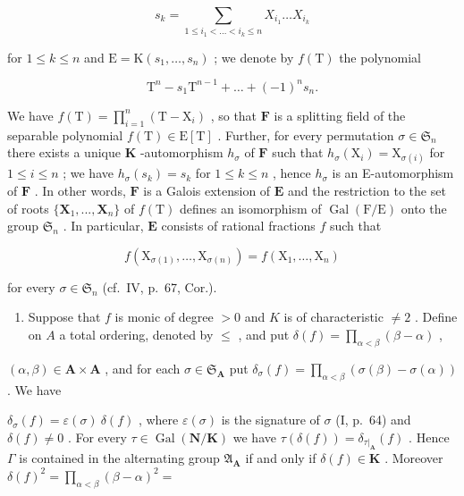 \[
s _ {k} = \sum_ {1 \leqslant i _ {1} <   \dots <   i _ {k} \leqslant n} X _ {i _ {1}} \dots X _ {i _ {k}}
\]

for \(1 \leqslant k \leqslant n\) and \(\mathrm{E} = \mathrm{K}(s_1, \ldots, s_n)\) ; we denote by \(f(\mathrm{T})\) the polynomial

\[
\mathrm{T} ^ {n} - s _ {1} \mathrm{T} ^ {n - 1} + \dots + (- 1) ^ {n} s _ {n}.
\]

We have \(f(\mathrm{T}) = \prod_{i=1}^{n} (\mathrm{T} - \mathrm{X}_i)\) , so that \(\mathbf{F}\) is a splitting field of the separable polynomial \(f(\mathrm{T}) \in \mathrm{E}[\mathrm{T}]\) . Further, for every permutation \(\sigma \in \mathfrak{S}_n\) there exists a unique \(\mathbf{K}\) -automorphism \(h_\sigma\) of \(\mathbf{F}\) such that \(h_\sigma(\mathrm{X}_i) = \mathrm{X}_{\sigma(i)}\) for \(1 \leqslant i \leqslant n\) ; we have \(h_\sigma(s_k) = s_k\) for \(1 \leqslant k \leqslant n\) , hence \(h_\sigma\) is an E-automorphism of \(\mathbf{F}\) . In other words, \(\mathbf{F}\) is a Galois extension of \(\mathbf{E}\) and the restriction to the set of roots \(\{\mathbf{X}_1, ..., \mathbf{X}_n\}\) of \(f(\mathrm{T})\) defines an isomorphism of \(\operatorname{Gal}(\mathrm{F}/\mathrm{E})\) onto the group \(\mathfrak{S}_n\) . In particular, \(\mathbf{E}\) consists of rational fractions \(f\) such that

\[
f \left(\mathrm{X} _ {\sigma (1)}, \dots , \mathrm{X} _ {\sigma (n)}\right) = f \left(\mathrm{X} _ {1}, \dots , \mathrm{X} _ {n}\right)
\]

for every \(\sigma \in \mathfrak{S}_n\) (cf.~IV, p.~67, Cor.).

\begin{enumerate}
\def\labelenumi{\arabic{enumi})}
\setcounter{enumi}{5}
\tightlist
\item
  Suppose that \(f\) is monic of degree \(> 0\) and \(K\) is of characteristic \(\neq 2\) . Define on \(A\) a total ordering, denoted by \(\leqslant\) , and put \(\delta(f) = \prod_{\alpha < \beta} (\beta - \alpha)\) ,
\end{enumerate}

\((\alpha, \beta) \in \mathbf{A} \times \mathbf{A}\) , and for each \(\sigma \in \mathfrak{S}_{\mathbf{A}}\) put \(\delta_{\sigma}(f) = \prod_{\alpha < \beta} (\sigma(\beta) - \sigma(\alpha))\) . We have

\(\delta_{\sigma}(f) = \varepsilon(\sigma)\ \delta(f)\) , where \(\varepsilon(\sigma)\) is the signature of \(\sigma\) (I, p.~64) and \(\delta(f) \neq 0\) . For every \(\tau \in \operatorname{Gal}(\mathbf{N}/\mathbf{K})\) we have \(\tau(\delta(f)) = \delta_{\tau|_{\mathbf{A}}}(f)\) . Hence \(\Gamma\) is contained in the alternating group \(\mathfrak{A}_{\mathbf{A}}\) if and only if \(\delta(f) \in \mathbf{K}\) . Moreover \(\delta(f)^2 = \prod_{\alpha < \beta} (\beta - \alpha)^2 =\)

